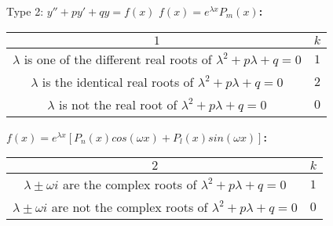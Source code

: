 \begin{frame}{Type 2: $y'' + py' + qy = f(x)$}
    \textbf{$f(x) = e^{\lambda x}P_m(x)$:}
    \begin{table}[!ht]
        \centering
        \begin{tabular}{c|c}

            $1$ & $k$                                        \\

            \hline
            \makecell{$\lambda$ is one of the different real \\ roots of $\lambda^2 + p\lambda + q = 0$}
                & $1$                                        \\



            \hline
            \makecell{$\lambda$ is the identical real        \\roots of $\lambda^2 + p\lambda + q = 0$}
                & $2$                                        \\

            \hline
            \makecell{$\lambda$ is not the real              \\ root of $\lambda^2 + p\lambda + q = 0$}
                & $0$
        \end{tabular}
    \end{table}
    \textbf{$f(x) = e^{\lambda x}[P_n(x)cos(\omega x) + P_l(x) sin(\omega x)]$:}
    \begin{table}[!ht]
        \centering
        \begin{tabular}{c|c}

            $2$ & $k$                                            \\

            \hline
            \makecell{ $\lambda \pm \omega i$ are the complex    \\ roots of $\lambda^2 + p\lambda + q = 0$ }
                & $1$                                            \\





            \hline
            \makecell{$\lambda \pm \omega i$ are not the complex \\ roots of $\lambda^2 + p\lambda + q = 0$}
                & $0$
        \end{tabular}
    \end{table}
\end{frame}





